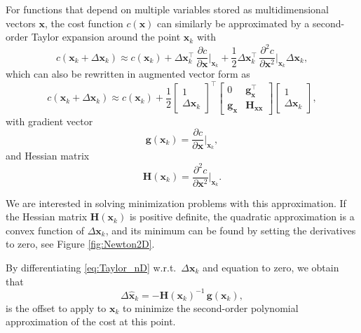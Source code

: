 \documentclass[10pt,a4paper]{article} %
\newcommand{\trsp}{{\scriptscriptstyle\top}}
\begin{document}
For functions that depend on multiple variables stored as multidimensional vectors $\bm{x}$, the cost function $c(\bm{x})$ can similarly be approximated by a second-order Taylor expansion around the point $\bm{x}_k$ with
\begin{equation}
	c(\bm{x}_k\!+\!\Delta\bm{x}_k) \approx c(\bm{x}_k) + \Delta\bm{x}_k^\trsp \, \frac{\partial c}{\partial\bm{x}}\Big|_{\bm{x}_k} +
	\frac{1}{2}\Delta\bm{x}_k^\trsp \, \frac{\partial^2c}{\partial\bm{x}^2}\Big|_{\bm{x}_k} \Delta\bm{x}_k,
	\label{eq:Taylor_nD}
\end{equation}
which can also be rewritten in augmented vector form as
\begin{equation*}
	c(\bm{x}_k\!+\!\Delta\bm{x}_k) \approx c(\bm{x}_k) + 
	\frac{1}{2}
	\begin{bmatrix}
	1 \\ \Delta\bm{x}_k
	\end{bmatrix}^{\!\trsp}
	\begin{bmatrix}
	0 & \bm{g}_{\bm{x}}^\trsp \\
	\bm{g}_{\bm{x}} & \bm{H}_{\bm{x}\bm{x}} 
	\end{bmatrix}
	\begin{bmatrix}
	1 \\ \Delta\bm{x}_k
	\end{bmatrix},
\end{equation*}
with gradient vector
\begin{equation}
	\bm{g}(\bm{x}_k) = \frac{\partial c}{\partial\bm{x}}\Big|_{\bm{x}_k},
	\label{eq:Taylor_grad}
\end{equation}
and Hessian matrix
\begin{equation}
	\bm{H}(\bm{x}_k) = \frac{\partial^2c}{\partial\bm{x}^2}\Big|_{\bm{x}_k}.
	\label{eq:Taylor_Hess}
\end{equation}

We are interested in solving minimization problems with this approximation. If the Hessian matrix $\bm{H}(\bm{x}_k)$ is positive definite, the quadratic approximation is a convex function of $\Delta\bm{x}_k$, and its minimum can be found by setting the derivatives to zero, see Figure \ref{fig:Newton2D}.

By differentiating \eqref{eq:Taylor_nD} w.r.t.\ $\Delta\bm{x}_k$ and equation to zero, we obtain that
\begin{equation*}
	\Delta\bm{\hat{x}}_k = - {\bm{H}(\bm{x}_k)}^{-1} \, \bm{g}(\bm{x}_k),
\end{equation*} 
is the offset to apply to $\bm{x}_k$ to minimize the second-order polynomial approximation of the cost at this point.
\end{document}
